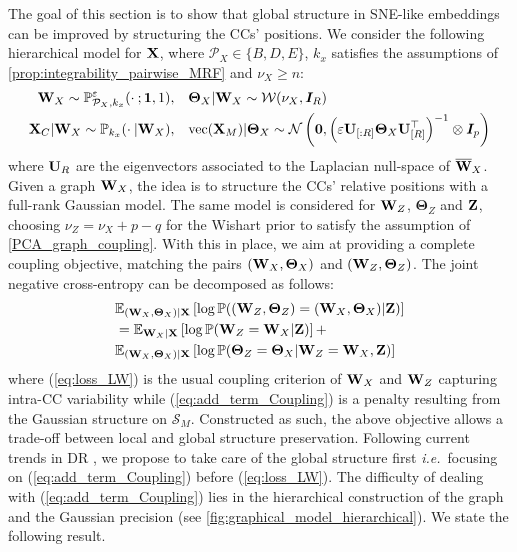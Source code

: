The goal of this section is to show that global structure in SNE-like embeddings can be improved by structuring the CCs' positions. We consider the following hierarchical model for $\mathbf{X}$, where $\mathcal{P}_{X} \in \{B,D,E\}$, $k_x$ satisfies the assumptions of \cref{prop:integrability_pairwise_MRF} and $\nu_{X} \geq n$:
\begin{align*}
    \mathbf{W}_{X} \sim \mathbb{P}_{\mathcal{P}_X,k_x}^{\varepsilon}(\cdot \: ; \bm{1},1), &\quad \bm{\Theta}_{X} | \mathbf{W}_{X} \sim \mathcal{W}(\nu_{X}, \bm{I}_{R}) \\
    \mathbf{X}_{C} |\mathbf{W}_{X} \sim \mathbb{P}_{k_x}(\cdot \:| \mathbf{W}_{X}), &\quad \mathrm{vec}(\mathbf{X}_{M}) | \bm{\Theta}_{X} \sim \mathcal{N}\left(\bm{0}, \left(\varepsilon \mathbf{U}_{[:R]}  \bm{\Theta}_{X}\mathbf{U}^\top_{[R]}\right)^{-1} \otimes \bm{I}_p\right)
\end{align*}
where $\mathbf{U}_{R}$ are the eigenvectors associated to the Laplacian null-space of $\overline{\mathbf{W}}_{X}$. Given a graph $\mathbf{W}_{X}$, the idea is to structure the CCs' relative positions with a full-rank Gaussian model.
The same model is considered for $\mathbf{W}_{Z}$, $\bm{\Theta}_{Z}$ and $\mathbf{Z}$, choosing $\nu_{Z} = \nu_{X} + p - q$ for the Wishart prior to satisfy the assumption of \cref{PCA_graph_coupling}.  With this in place, we aim at providing a complete coupling objective, matching the pairs  $(\mathbf{W}_{X},\bm{\Theta}_{X})$ and  $(\mathbf{W}_{Z},\bm{\Theta}_{Z})$. The joint negative cross-entropy can be decomposed as follows:
\begin{align}
    &\mathbb{E}_{(\mathbf{W}_{X}, \bm{\Theta}_{X})|\mathbf{X}}\left[\log \mathbb{P}((\mathbf{W}_{Z},\bm{\Theta}_{Z}) = (\mathbf{W}_{X},\bm{\Theta}_{X}) | \mathbf{Z})\right] \nonumber\\
    &= \mathbb{E}_{\mathbf{W}_{X}|\mathbf{X}}\left[\log \mathbb{P}(\mathbf{W}_{Z} = \mathbf{W}_{X} | \mathbf{Z})\right] + \label{eq:loss_LW} \\
    & \mathbb{E}_{(\mathbf{W}_{X},\bm{\Theta}_{X})|\mathbf{X}}\left[ \log \mathbb{P}(\bm{\Theta}_{Z} = \bm{\Theta}_{X}| \mathbf{W}_{Z} = \mathbf{W}_{X}, \mathbf{Z}) \right] \label{eq:add_term_Coupling}
\end{align}
where (\ref{eq:loss_LW}) is the usual coupling criterion of $\mathbf{W}_X$ and $\mathbf{W}_Z$ capturing intra-CC variability while (\ref{eq:add_term_Coupling}) is a penalty resulting from the Gaussian structure on $\mathcal{S}_{M}$. Constructed as such, the above objective allows a trade-off between local and global structure preservation. Following current trends in DR \citep{kobak2021initialization}, we propose to take care of the global structure first \textit{i.e.}\ focusing on (\ref{eq:add_term_Coupling}) before (\ref{eq:loss_LW}). The difficulty of dealing with (\ref{eq:add_term_Coupling}) lies in the hierarchical construction of the graph and the Gaussian precision (see \cref{fig:graphical_model_hierarchical}). We state the following result.

